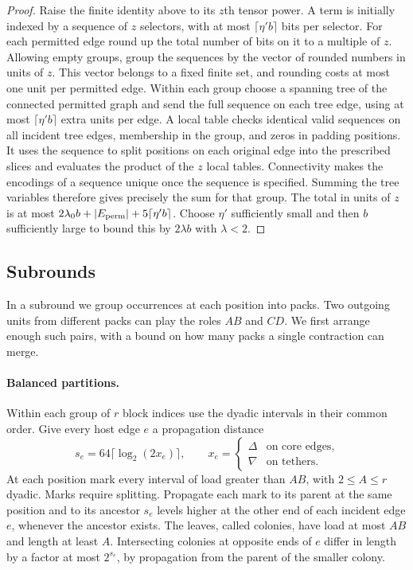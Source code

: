 \begin{proof}
Raise the finite identity above to its $z$th tensor power. A term is
initially indexed by a sequence of $z$ selectors, with at most
$\lceil\eta'b\rceil$ bits per selector. For each permitted edge round
up the total number of bits on it to a multiple of $z$. Allowing empty groups, group the
sequences by the vector of rounded numbers in units of $z$. This
vector belongs to a fixed finite set, and rounding costs at most one
unit per permitted edge. Within each group choose a spanning tree
of the connected permitted graph and send the full sequence on each
tree edge, using at most $\lceil\eta'b\rceil$ extra units per edge.
A local table checks identical valid sequences on all incident tree
edges, membership in the group, and zeros in padding positions.
It uses the sequence to split positions on each original edge into
the prescribed slices and evaluates the product of the $z$ local
tables. Connectivity makes the encodings of a sequence unique once
the sequence is specified. Summing the tree variables therefore gives
precisely the sum for that group. The total in units of $z$ is at most
$2\lambda_0 b+|E_{\rm perm}|+5\lceil\eta'b\rceil$. Choose $\eta'$
sufficiently small and then $b$ sufficiently large to bound this by
$2\lambda b$ with $\lambda<2$.
\end{proof}


\subsection{Subrounds}
In a subround we group occurrences at each position into packs. Two
outgoing units from different packs can play the roles \(AB\) and \(CD\).
We first arrange enough such pairs, with a bound on how many packs a
single contraction can merge.

\paragraph{Balanced partitions.}
Within each group of \(r\) block indices use the dyadic intervals in their common order. Give every host edge \(e\) a propagation distance
\[
 s_e=64\lceil\log_2(2x_e)\rceil,\qquad
 x_e=\begin{cases}\Delta&\text{on core edges},\\
                     \nabla&\text{on tethers}.\end{cases}
\]
At each position mark every interval of load greater than \(AB\), with \(2\le A\le r\) dyadic. Marks require splitting. Propagate each mark to its parent at the same position and to its ancestor \(s_e\) levels higher at the other end of each incident edge \(e\), whenever the ancestor exists. The leaves, called colonies, have load at most \(AB\) and length at least \(A\). Intersecting colonies at opposite ends of \(e\) differ in length by a factor at most \(2^{s_e}\), by propagation from the parent of the smaller colony.

